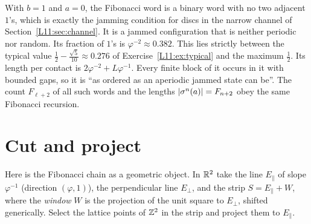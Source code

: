 \begin{remark}
With $b=1$ and $a=0$, the Fibonacci word is a binary word with no two adjacent $1$'s, which is exactly
the jamming condition for discs in the narrow channel of Section~\ref{L11:sec:channel}. It is a
jammed configuration that is neither periodic nor random. Its fraction of $1$'s is
$\varphi^{-2}\approx0.382$. This lies strictly between the typical value
$\frac12-\frac{\sqrt5}{10}\approx0.276$ of Exercise~\ref{L11:ex:typical} and the maximum $\frac12$. Its
length per contact is $2\varphi^{-2}+L\varphi^{-1}$. Every finite block of it occurs in it with bounded
gaps, so it is ``as ordered as an aperiodic jammed state can be''. The count $F_{\ell+2}$ of all such
words and the lengths $\left\lvert \sigma^n(a) \right\rvert=F_{n+2}$ obey the same Fibonacci recursion.
\end{remark}

\section{Cut and project}
\label{ERG:sec:cutproject}

Here is the Fibonacci chain as a geometric object. In $\mathbb{R}^2$ take the line $E_\parallel$ of slope
$\varphi^{-1}$ (direction $(\varphi,1)$), the perpendicular line $E_\perp$, and the strip
$S=E_\parallel+W$, where the \emph{window} $W$ is the projection of the unit square to $E_\perp$, shifted
generically. Select the lattice points of $\mathbb{Z}^2$ in the strip and project them to $E_\parallel$.

